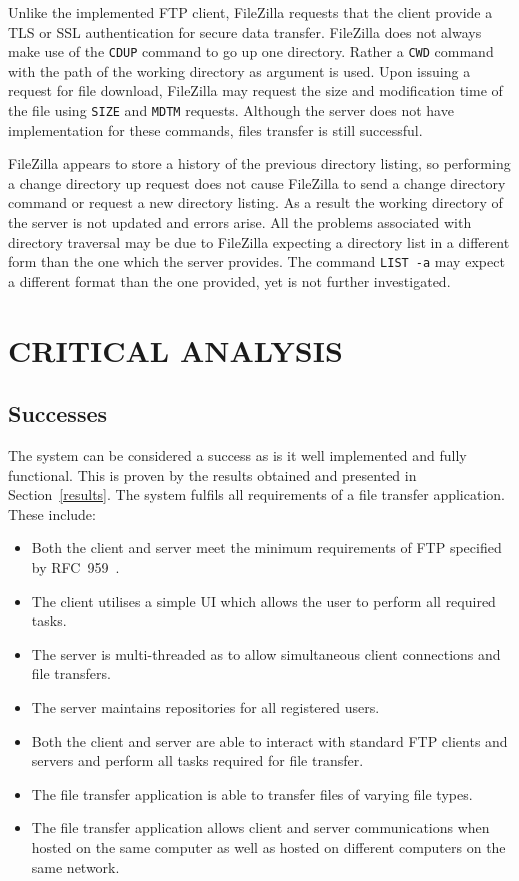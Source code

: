 \documentclass[10pt,twocolumn]{witseiepaper}
\begin{document}
Unlike the implemented FTP client, FileZilla requests that the client provide a TLS or SSL authentication for secure data transfer. FileZilla does not always make use of the \texttt{CDUP} command to go up one directory. Rather a \texttt{CWD} command with the path of the working directory as argument is used. Upon issuing a request for file download, FileZilla may request the size and modification time of the file using \texttt{SIZE} and \texttt{MDTM} requests. Although the server does not have implementation for these commands, files transfer is still successful.

FileZilla appears to store a history of the previous directory listing, so performing a change directory up request does not cause FileZilla to send a change directory command or request a new directory listing. As a result the working directory of the server is not updated and errors arise. All the problems associated with directory traversal may be due to FileZilla expecting a directory list in a different form than the one which the server provides. The command \texttt{LIST~-a} may expect a different format than the one provided, yet is not further investigated.


\section{CRITICAL ANALYSIS}

\subsection{Successes}

The system can be considered a success as is it well implemented and fully functional. This is proven by the results obtained and presented in Section~\ref{results}. The system fulfils all requirements of a file transfer application. These include:

\vspace*{-2mm}

\begin{itemize}
	\item Both the client and server meet the minimum requirements of FTP specified by RFC~959~\cite{rfc959}.
	\item The client utilises a simple UI which allows the user to perform all required tasks.
	\item The server is multi-threaded as to allow simultaneous client connections and file transfers.
	\item The server maintains repositories for all registered users.
	\item Both the client and server are able to interact with standard FTP clients and servers and perform all tasks required for file transfer.
	\item The file transfer application is able to transfer files of varying file types.
	\item The file transfer application allows client and server communications when hosted on the same computer as well as hosted on different computers on the same network.
\end{itemize} 
\vspace*{-2mm}
\end{document}
